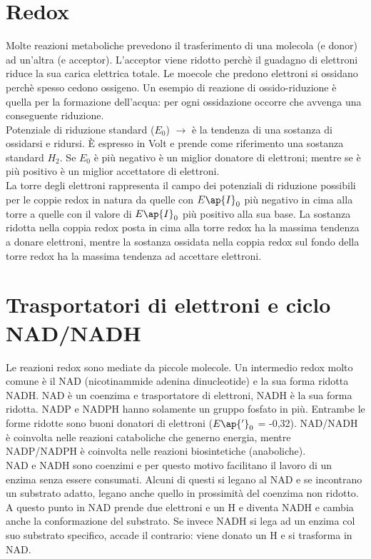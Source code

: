\section{Redox}
Molte reazioni metaboliche prevedono il trasferimento di una molecola (e\ap{-} donor) ad un'altra (e\ap{-} acceptor). L'acceptor viene ridotto perch\`e il guadagno di elettroni riduce la sua carica elettrica totale. Le moecole che predono elettroni si ossidano perch\`e spesso cedono ossigeno. Un esempio di reazione di ossido-riduzione \`e quella per la formazione dell'acqua: per ogni ossidazione occorre che avvenga una conseguente riduzione.
\\Potenziale di riduzione standard ($E_0$) $\xrightarrow{}$ \`e la tendenza di una sostanza di ossidarsi e ridursi. \`E espresso in Volt e prende come riferimento una sostanza standard $H_2$. Se $E_0$ \`e pi\`u negativo è un miglior donatore di elettroni; mentre se \`e pi\`u positivo \`e un miglior accettatore di elettroni.
\\La torre degli elettroni rappresenta il campo dei potenziali di riduzione possibili per le coppie redox in natura da quelle con $E\ap{I}_0$ pi\`u negativo in cima alla torre  a quelle con il valore di $E\ap{I}_0$ pi\`u positivo alla sua base. La sostanza ridotta nella coppia redox posta in cima alla torre redox ha la massima tendenza a donare elettroni, mentre la sostanza ossidata nella coppia redox sul fondo della torre redox ha la massima tendenza ad accettare elettroni. 
\section{Trasportatori di elettroni e ciclo NAD/NADH}
Le reazioni redox sono mediate da piccole molecole. Un intermedio redox molto comune \`e il NAD\ap{+} (nicotinammide adenina dinucleotide) e la sua forma ridotta NADH. NAD\ap{+} \`e un coenzima e trasportatore di elettroni, NADH \`e la sua forma ridotta. NADP\ap{+} e NADPH hanno solamente un gruppo fosfato in pi\`u. Entrambe le forme ridotte sono buoni donatori di elettroni ($E\ap{'}_0$ = -0,32). NAD\ap{+}/NADH \`e coinvolta nelle reazioni cataboliche che generno energia, mentre NADP\ap{+}/NADPH \`e coinvolta nelle reazioni biosintetiche (anaboliche).
\\NAD\ap{+} e NADH sono coenzimi e per questo motivo facilitano il lavoro di un enzima senza essere consumati. Alcuni di questi si legano al NAD\ap{+} e se incontrano un substrato adatto, legano anche quello in prossimit\`a del coenzima non ridotto. A questo punto in NAD prende due elettroni e un H\ap{+} e diventa NADH e cambia anche la conformazione del substrato. Se invece NADH si lega ad un enzima col suo substrato specifico, accade il contrario: viene donato un H\ap{+} e si trasforma in NAD\ap{+}.
